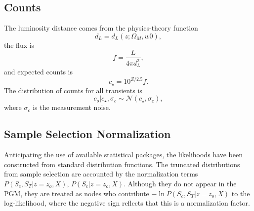 \documentclass[preprint,3p]{elsarticle}
\begin{document}
\subsection{Counts}
The luminosity distance comes from the physics-theory function
\begin{equation}
d_L = d_L(z; \Omega_M, w0),
\end{equation}
the flux is
\begin{equation}
f = \frac{L}{4\pi d_L^2},
\end{equation}
and expected counts is
\begin{equation}
c_\star = 10^{Z/2.5}f.
\end{equation}
The distribution of counts for all transients is 
\begin{equation}
c_o | c_\star, \sigma_c \sim \mathcal{N}(c_\star, \sigma_c),
\end{equation}
where $\sigma_c$ is the measurement noise.

\subsection{Sample Selection Normalization}
Anticipating the use of available statistical packages, the likelihoods have been constructed
from standard distribution functions.  The truncated distributions from sample selection
are accounted by the normalization 
terms $P(S_c, S_T| z=z_o, X)$, $P(S_c| z=z_o, X)$.  Although they do not appear
in the PGM, they are treated as nodes who contribute 
$-\ln{P(S_c, S_T| z=z_o, X)}$ to the log-likelihood, where the negative sign reflects that this is a normalization
factor.
\end{document}
